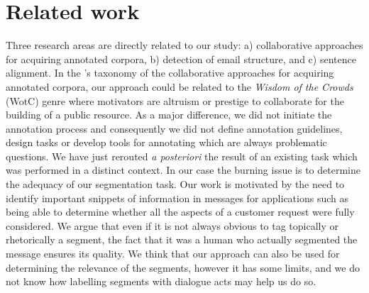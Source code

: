 \section{Related work}
\label{sec:relatedWork}

Three research areas are directly related to our study:
a) collaborative approaches for acquiring
annotated corpora, b) detection of email structure, and c) sentence alignment.
%
In the \cite{wang:2013:lre}'s taxonomy of the collaborative approaches for acquiring annotated corpora, our approach could be related to the \textit{Wisdom of the Crowds} (WotC) genre where motivators are altruism or prestige to collaborate for the building of a public resource.
As a major difference, we did not initiate the annotation process and consequently we did not define annotation guidelines, design tasks or develop tools for annotating which are always problematic questions.
We have just rerouted \textit{a posteriori} the result of an existing task which was performed in a distinct context.
In our case the burning issue is to determine the adequacy of our segmentation task.
Our work is motivated by the need to identify important snippets of information in messages for applications such as being able to determine whether all the aspects of a customer request were fully considered.
We argue that even if it is not always obvious to tag topically or rhetorically a segment, the fact that it was a human who actually segmented the message ensures its quality.
%
%
We think that our approach can also be used for determining the relevance of the segments, however it has some limits, and we do not know how labelling segments with dialogue acts may help us do so.

